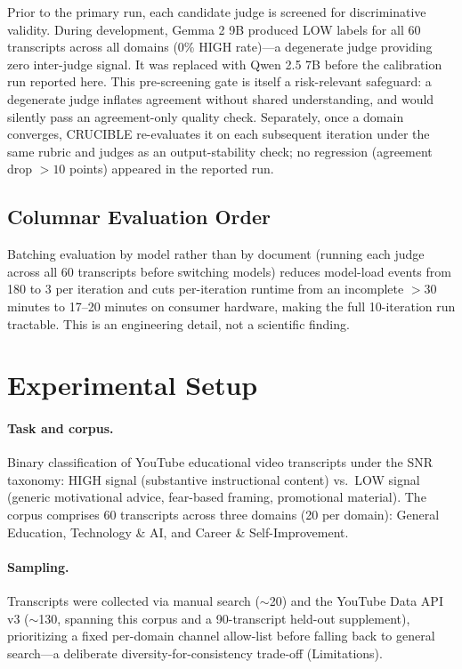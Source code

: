 \documentclass[letterpaper]{article}
\begin{document}
Prior to the primary run, each candidate judge is screened for discriminative
validity. During development, Gemma 2 9B produced LOW labels for all 60
transcripts across all domains (0\% HIGH rate)---a degenerate judge providing
zero inter-judge signal. It was replaced with Qwen 2.5 7B before the
calibration run reported here. This pre-screening gate is itself a
risk-relevant safeguard: a degenerate judge inflates agreement without shared
understanding, and would silently pass an agreement-only quality check.
Separately, once a domain converges, CRUCIBLE re-evaluates it on each
subsequent iteration under the same rubric and judges as an output-stability
check; no regression (agreement drop $>10$ points) appeared in the reported
run.

\subsection{Columnar Evaluation Order}

Batching evaluation by model rather than by document (running each judge
across all 60 transcripts before switching models) reduces model-load events
from 180 to 3 per iteration and cuts per-iteration runtime from an incomplete
$>$30 minutes to 17--20 minutes on consumer hardware, making the full
10-iteration run tractable. This is an engineering detail, not a scientific
finding.

\section{Experimental Setup}
\label{sec:setup}

\paragraph{Task and corpus.}
Binary classification of YouTube educational video transcripts under the SNR
taxonomy: HIGH signal (substantive instructional content) vs.\ LOW signal
(generic motivational advice, fear-based framing, promotional material). The
corpus comprises 60 transcripts across three domains (20 per domain):
General Education, Technology \& AI, and Career \& Self-Improvement.

\paragraph{Sampling.}
Transcripts were collected via manual search ($\sim$20) and the YouTube Data
API v3 ($\sim$130, spanning this corpus and a 90-transcript held-out
supplement), prioritizing a fixed per-domain channel allow-list before
falling back to general search---a deliberate diversity-for-consistency
trade-off (Limitations).
\end{document}
